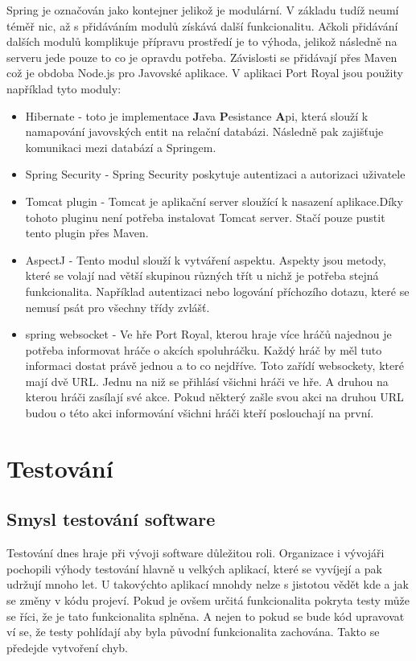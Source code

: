 \documentclass[czech,master,public,dept460,male,cpdeclaration,twoside]{diploma}
\begin{document}
Spring je označován jako kontejner jelikož je modulární. V základu tudíž neumí téměř nic, až s přidáváním modulů získává další funkcionalitu. Ačkoli  přidávání dalších modulů komplikuje přípravu prostředí je to výhoda, jelikož následně na serveru jede pouze to co je opravdu potřeba. Závislosti se přidávají přes Maven což je obdoba Node.js pro Javovské aplikace. V aplikaci Port Royal jsou použity například tyto moduly:
\begin{itemize}
	\item Hibernate - toto je implementace {\bf J}ava {\bf P}esistance {\bf A}pi, která slouží k namapování javovských entit na relační databázi. Následně pak zajišťuje komunikaci mezi databází a Springem.
	\item Spring Security - Spring Security poskytuje autentizaci a autorizaci uživatele
	\item Tomcat plugin - Tomcat je aplikační server sloužící k nasazení aplikace.Díky tohoto pluginu není potřeba instalovat Tomcat server. Stačí pouze pustit tento plugin přes Maven.
	\item AspectJ - Tento modul slouží k vytváření aspektu. Aspekty jsou metody, které se volají nad větší skupinou různých třít u nichž je potřeba stejná funkcionalita. Například autentizaci nebo logování příchozího dotazu, které se nemusí psát pro všechny třídy zvlášť.
	\item spring websocket - Ve hře Port Royal, kterou hraje více hráčů najednou je potřeba informovat hráče o akcích spoluhráčku. Každý hráč by měl tuto informaci dostat právě jednou a to co nejdříve. Toto zařídí websockety, které mají dvě URL. Jednu na niž se přihlásí všichni hráči ve hře. A druhou na kterou hráči zasílají své akce. Pokud některý zašle svou akci na druhou URL budou o této akci informování všichni hráči kteří poslouchají na první.
\end{itemize}

\section{Testování}

\subsection{Smysl testování software}
Testování dnes hraje při vývoji software důležitou roli. Organizace i vývojáři pochopili výhody testování hlavně u velkých aplikací, které se vyvíjejí a pak udržují mnoho let. U takovýchto aplikací mnohdy nelze s jistotou vědět kde a jak se změny v kódu projeví. Pokud je ovšem určitá funkcionalita pokryta testy může se říci, že je tato funkcionalita splněna. A nejen to pokud se bude kód upravovat ví se, že testy pohlídají aby byla původní funkcionalita zachována. Takto se předejde vytvoření chyb.
\end{document}
